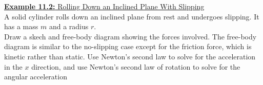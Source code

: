 \documentclass[a4paper]{article}
\let\bf\textbf
\begin{document}
\begin{shaded}
    \underline{\bf{Example 11.2:} Rolling Down an Inclined Plane With Slipping}
    \vspace{2mm}\\
    A solid cylinder rolls down an inclined plane from rest and undergoes slipping. It has a mass $m$ and a radius $r$.\vspace{1mm}\\
    Draw a skech and free-body diagram showing the forces involved. The free-body diagram is similar to the no-slipping case except for the friction force, which is kinetic rather than static. Use Newton's second law to solve for the acceleration in the $x$ direction, and use Newton's second law of rotation to solve for the angular acceleration
    \begin{center}
\end{center}
\end{shaded}
\end{document}
